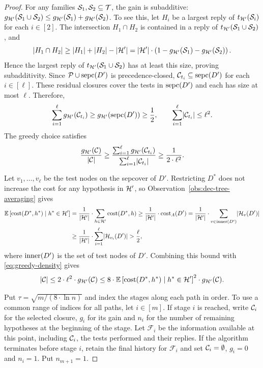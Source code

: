 \begin{proof}
For any families $\mathcal{S}_1,\mathcal{S}_2\subseteq\mathcal{T}$, the gain is subadditive: $g_{\mathcal{H}'}(\mathcal{S}_1\cup \mathcal{S}_2)\leq g_{\mathcal{H}'}(\mathcal{S}_1)+g_{\mathcal{H}'}(\mathcal{S}_2)$. To see this, let $H_i$ be a largest reply of $t_{\mathcal{H}'}\mathopen{}\left( \mathcal{S}_i \right)$ for each $i\in[2]$. The intersection $H_1\cap H_2$ is contained in a reply of $t_{\mathcal{H}'}\mathopen{}\left( \mathcal{S}_1\cup \mathcal{S}_2 \right)$, and
\[
    \mathopen{}\left| H_1\cap H_2 \right|\geq\mathopen{}\left| H_1 \right|+\mathopen{}\left| H_2 \right|-\mathopen{}\left| \mathcal{H}' \right|
    =\mathopen{}\left| \mathcal{H}' \right|\cdot\mathopen{}\left( 1-g_{\mathcal{H}'}(\mathcal{S}_1)-g_{\mathcal{H}'}(\mathcal{S}_2) \right).
\]
Hence the largest reply of $t_{\mathcal{H}'}\mathopen{}\left( \mathcal{S}_1\cup \mathcal{S}_2 \right)$ has at least this size, proving subadditivity. Since $\mathcal{P}\cup\operatorname{sepc}\mathopen{}\left( D' \right)$ is precedence-closed, $\mathcal{C}_{t_i}\subseteq\operatorname{sepc}\mathopen{}\left( D' \right)$ for each $i\in[\ell]$. These residual closures cover the tests in $\operatorname{sepc}\mathopen{}\left( D' \right)$ and each has size at most $\ell$. Therefore,
\[
    \sum_{i=1}^{\ell} g_{\mathcal{H}'}(\mathcal{C}_{t_i})\geq g_{\mathcal{H}'}\mathopen{}\left( \operatorname{sepc}\mathopen{}\left( D' \right) \right)\geq\frac12,
    \qquad
    \sum_{i=1}^{\ell}\mathopen{}\left| \mathcal{C}_{t_i} \right|\leq\ell^2.
\]
The greedy choice satisfies
\begin{equation}\label{eq:greedy-density}
    \frac{g_{\mathcal{H}'}(\mathcal{C})}{\mathopen{}\left| \mathcal{C} \right|}
    \geq\frac{\sum_{i=1}^{\ell}g_{\mathcal{H}'}(\mathcal{C}_{t_i})}{\sum_{i=1}^{\ell}\mathopen{}\left| \mathcal{C}_{t_i} \right|}
    \geq\frac{1}{2\cdot\ell^2}.
\end{equation}

Let $v_1,\ldots,v_\ell$ be the test nodes on the sepcover of $D'$. Restricting $D^*$ does not increase the cost for any hypothesis in $\mathcal{H}'$, so Observation~\ref{obs:dec-tree-averaging} gives
\begin{align*}
    \mathbb{E}\left[\operatorname{cost}\mathopen{}\left( D^*,h^* \right)\mid h^*\in\mathcal{H}'\right]
    &=\frac{1}{\mathopen{}\left| \mathcal{H}' \right|}\cdot\sum_{h\in\mathcal{H}'}\operatorname{cost}\mathopen{}\left( D^*,h \right)
    \geq\frac{1}{\mathopen{}\left| \mathcal{H}' \right|}\cdot\operatorname{cost}_A\mathopen{}\left( D' \right)
    =\frac{1}{\mathopen{}\left| \mathcal{H}' \right|}\cdot\sum_{v\in\operatorname{inner}(D')}\mathopen{}\left| \mathcal{H}_v(D') \right|\\
    &\geq\frac{1}{\mathopen{}\left| \mathcal{H}' \right|}\cdot\sum_{i=1}^{\ell}\mathopen{}\left| \mathcal{H}_{v_i}(D') \right|
    >\frac{\ell}{2},
\end{align*}
where $\operatorname{inner}(D')$ is the set of test nodes of $D'$.
Combining this bound with \eqref{eq:greedy-density} gives
\begin{equation}\label{eq:greedy-average-density}
    \mathopen{}\left| \mathcal{C} \right|\leq 2\cdot\ell^2\cdot g_{\mathcal{H}'}(\mathcal{C})
    \leq 8\cdot\mathbb{E}\left[\operatorname{cost}\mathopen{}\left( D^*,h^* \right)\mid h^*\in\mathcal{H}'\right]^2
    \cdot g_{\mathcal{H}'}(\mathcal{C}).
\end{equation}

Put $\tau=\sqrt{m/(8\cdot\ln n)}$ and index the stages along each path in order. To use a common range of indices for all paths, let $i\in[m]$. If stage $i$ is reached, write $\mathcal{C}_i$ for the selected closure, $g_i$ for its gain and $n_i$ for the number of remaining hypotheses at the beginning of the stage. Let $\mathcal{F}_i$ be the information available at this point, including $\mathcal{C}_i$, the tests performed and their replies. If the algorithm terminates before stage $i$, retain the final history for $\mathcal{F}_i$ and set $\mathcal{C}_i=\emptyset$, $g_i=0$ and $n_i=1$. Put $n_{m+1}=1$.


\end{proof}

